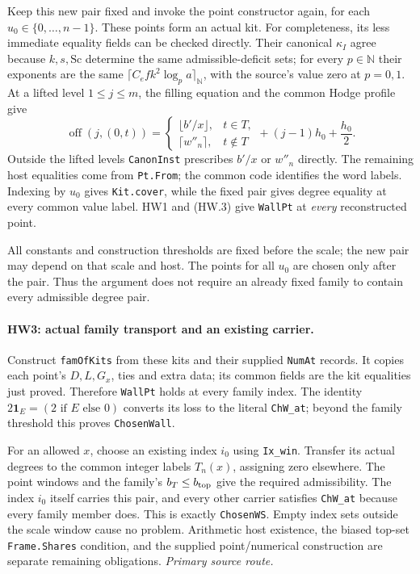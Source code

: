 \documentclass[11pt,a4paper]{article}
\numberwithin{equation}{section}
\theoremstyle{remark}\newtheorem{remark}[theorem]{Remark}
\begin{document}
Keep this new pair fixed and invoke the point constructor again, for
each $u_0\in\{0,\ldots,n-1\}$. These points form an actual kit.
For completeness, its less immediate equality fields can be checked
directly. Their canonical $\kappa_I$ agree because $k,s,\mathrm{Sc}$
determine the same admissible-deficit sets; for every $p\in\mathbb N$
their exponents are the same
$\lceil C_e f k^2\log_p a\rceil_{\mathbb N}$, with the source's
value zero at $p=0,1$. At a lifted level $1\le j\le m$,
the filling equation and the common Hodge profile give
\[
 \operatorname{off}(j,(0,t))=
 \begin{cases}\lfloor b'/x\rfloor,&t\in T,\\
               \lceil w''_n\rceil,&t\notin T
 \end{cases}
 +(j-1)h_0+\frac{h_0}{2}.                         \tag{HW.4}
\]
Outside the lifted levels \texttt{CanonInst} prescribes $b'/x$ or
$w''_n$ directly. The remaining host equalities come from
\texttt{Pt.From}; the common code identifies the word labels. Indexing
by $u_0$ gives \texttt{Kit.cover}, while the fixed pair gives degree
equality at every common value label. HW1 and (HW.3) give
\texttt{WallPt} at \emph{every} reconstructed point.

All constants and construction thresholds are fixed before the scale;
the new pair may depend on that scale and host. The points for all
$u_0$ are chosen only after the pair. Thus the argument does not require
an already fixed family to contain every admissible degree pair.

\paragraph{HW3: actual family transport and an existing carrier.}
Construct \texttt{famOfKits} from these kits and their supplied
\texttt{NumAt} records. It copies each point's $D,L,G_x$, ties and extra
data; its common fields are the kit equalities just proved. Therefore
\texttt{WallPt} holds at every family index. The identity
$2\mathbf1_E=(2\text{ if }E\text{ else }0)$ converts its loss to the
literal \texttt{ChW\_at}; beyond the family threshold this proves
\texttt{ChosenWall}.

For an allowed $x$, choose an existing index $i_0$ using
\texttt{Ix\_win}. Transfer its actual degrees to the common integer
labels $T_n(x)$, assigning zero elsewhere. The point windows and the
family's $b_T\le b_{\rm top}$ give the required admissibility. The
index $i_0$ itself carries this pair, and every other carrier satisfies
\texttt{ChW\_at} because every family member does. This is exactly
\texttt{ChosenWS}. Empty index sets outside the scale window cause no
problem. Arithmetic host existence, the biased top-set
\texttt{Frame.Shares} condition, and the supplied point/numerical
construction are separate remaining obligations.
\noindent\textit{Primary source route.}\cite{host-degree-realization}
\end{document}
